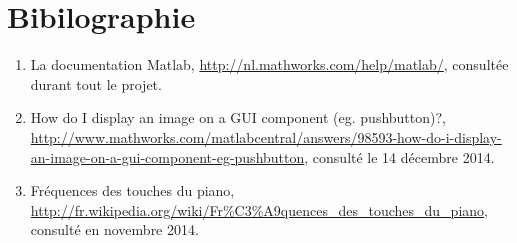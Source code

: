 \section*{Bibilographie}
\begin{enumerate}
\item La documentation Matlab, \url{http://nl.mathworks.com/help/matlab/}, consultée durant tout le projet.
\item How do I display an image on a GUI component (eg. pushbutton)?, \url{http://www.mathworks.com/matlabcentral/answers/98593-how-do-i-display-an-image-on-a-gui-component-eg-pushbutton}, consulté le 14 décembre 2014.
\item Fréquences des touches du piano, \url{http://fr.wikipedia.org/wiki/Fr%C3%A9quences_des_touches_du_piano}, consulté en novembre 2014.
\end{enumerate}